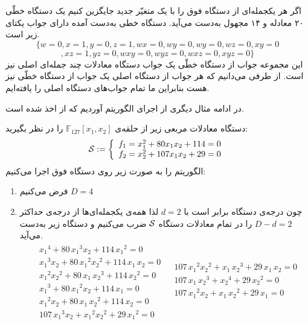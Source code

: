 \begin{example}
	اگر هر یکجمله‌ای از دستگاه فوق را با یک متغیّر جدید جایگزین کنیم یک دستگاه خطّی ۲۰ معادله و ۱۴ مجهول به‌دست  می‌آید. دستگاه خطی به‌دست  آمده دارای جواب یکتای زیر است.
	$$\{w = 0, x = 1, y = 0, z = 1, wx = 0, wy = 0, wy = 0, wz = 0, xy = 0$$
	$$, xz = 1, yz = 0, wxy = 0, wyz = 0, wxz = 0, xyz = 0\}$$
	این مجموعه جواب از دستگاه خطّی یک جواب دستگاه معادلات چند جمله‌ای اصلی نیز است. از طرفی می‌دانیم که هر جواب از دستگاه اصلی یک جواب از دستگاه خطّی نیز هست بنابراین ما تمام جواب‌های دستگاه اصلی را یافته‌ایم.
\end{example}
در ادامه  مثال دیگری از اجرای الگوریتم 
آوردیم  که از 
\cite{albrecht2008algebraic}
اخذ شده است.
\begin{example}
	دستگاه معادلات مربعی زیر از حلقه‌ی 
	$\mathbb{F}_{127}[x_{1},x_{2}]$
	را در نظر بگیرید:
	$${\mathcal S}:=\left \{ \begin{array}{l}
	f_{1} = x_{1}^{2}+80 x_{1}x_{2}+114 = 0\\
	f_{2} = x_{2}^{2}+107 x_{1}x_{2}+29 = 0\\
	\end{array} \right.$$
	الگوریتم 
	را به صورت زیر روی دستگاه فوق اجرا می‌کنیم:
	\begin{enumerate}
		\item
		فرض می‌کنیم 
		$D = 4$
		\item
		چون درجه‌ی دستگاه برابر است با 
		$d = 2$
		لذا همه‌ی یکجمله‌ای‌ها از درجه‌ی حداکثر 
		$D - d = 2$
		را در تمام معادلات دستگاه 
		${\mathcal S}$
		ضرب می‌کنیم  و دستگاه زیر به‌دست می‌آید. 
\begin{align*}
\begin{split}
&{x_{1}}^{4}+80\,{x_{1}}^{3}x_{2}+114\,{x_{1}}^{2}=0\\
&{x_{1}}^{3}x_{2}+80\,{x_{1}}^{2}{x_{2}}^{2}+114\,x_{1}\,x_{2}=0\\ 
&{x_{1}}^{2}{x_{2}}^{2}+80\,x_{1}\,{x_{2}}^{3}+114\,{x_{2}}^{2}=0\\
&{x_{1}}^{3}+80\,{x_{1}}^{2}x_{2}+114\,x_{1}=0\\
&{x_{1}}^{2}x_{2}+80\,x_{1}\,{x_{2}}^{2}+114\,x_{2}=0\\
&107\,{x_{1}}^{3}x_{2}+{x_{1}}^{2}{x_{2}}^{2}+29\,{x_{1}}^{2}=0
\end{split}
\begin{split}
&107\,{x_{1}}^{2}{x_{2}}^{2}+x_{1}\,{x_{2}}^{3}+29\,x_{1}\,x_{2}=0\\ 
&107\,x_{1}\,{x_{2}}^{3}+{x_{2}}^{4}+29\,{x_{2}}^{2}=0\\
&107\,{x_{1}}^{2}x_{2}+x_{1}\,{x_{2}}^{2}+29\,x_{1}=0\\

\end{split}
\end{align*}
\end{enumerate}
\end{example}
